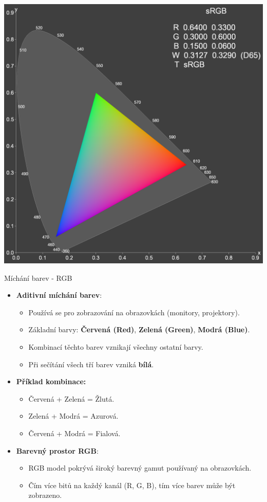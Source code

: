 \documentclass[aspectratio=43]{beamer}
\begin{document}
\begin{frame}{}
    \begin{center}
        \includegraphics[width=0.7\linewidth]{extrahovane_obrazky/gamut.png}
    \end{center}
\end{frame}

\begin{frame}{Míchání barev - RGB}
    \begin{itemize}
        \item \textbf{Aditivní míchání barev}:
        \begin{itemize}
            \item Používá se pro zobrazování na obrazovkách (monitory, projektory).
            \item Základní barvy: \textbf{Červená (Red)}, \textbf{Zelená (Green)}, \textbf{Modrá (Blue)}.
            \item Kombinací těchto barev vznikají všechny ostatní barvy.
            \item Při sečítání všech tří barev vzniká \textbf{bílá}.
        \end{itemize}
        \item \textbf{Příklad kombinace:}
        \begin{itemize}
            \item Červená + Zelená = Žlutá.
            \item Zelená + Modrá = Azurová.
            \item Červená + Modrá = Fialová.
        \end{itemize}
        \item \textbf{Barevný prostor RGB}: 
        \begin{itemize}
            \item RGB model pokrývá široký barevný gamut používaný na obrazovkách.
            \item Čím více bitů na každý kanál (R, G, B), tím více barev může být zobrazeno.
        \end{itemize}
    \end{itemize}
\end{frame}
\end{document}
